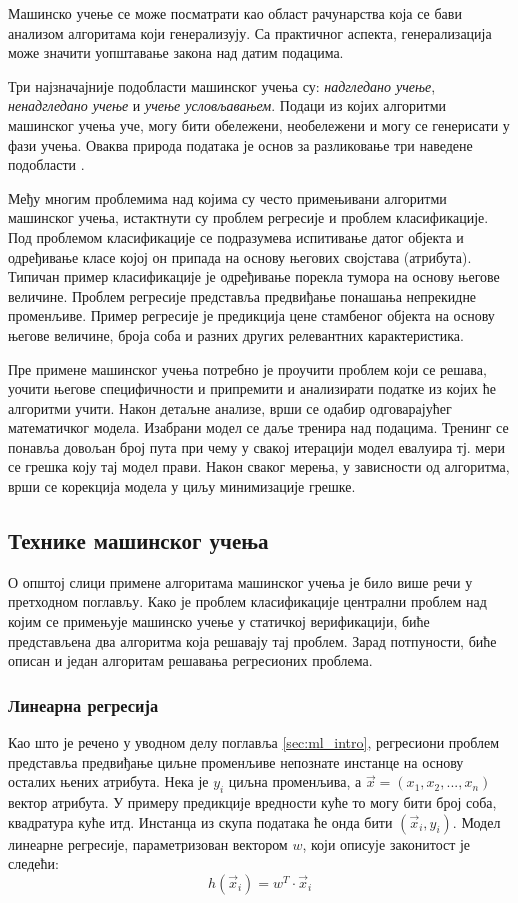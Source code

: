 \documentclass[a4paper]{article}
\begin{document}
{Машинско учење се може посматрати као област рачунарства која се бави анализом алгоритама који генерализују. Са практичног аспекта, генерализација може значити уопштавање закона над датим подацима.


Три најзначајније подобласти машинског учења су: \textit{надгледано учење}, \textit{ненадгледано учење} и \textit{учење условљавањем}. Подаци из којих алгоритми машинског учења уче, могу бити обележени, необележени и могу се генерисати у фази учења. Оваква природа података је основ за разликовање три наведене подобласти \cite{tom-ml}.


Међу многим проблемима над којима су често примењивани алгоритми машинског учења, истактнути су проблем регресије и проблем класификације. Под проблемом класификације се подразумева испитивање датог објекта и одређивање класе којој он припада на основу његових својстава (атрибута). Типичан пример класификације је одређивање порекла тумора на основу његове величине. Проблем регресије представља предвиђање понашања непрекидне променљиве. Пример регресије је предикција цене стамбеног објекта на основу његове величине, броја соба и разних других релевантних карактеристика.


Пре примене машинског учења потребно је проучити проблем који се решава, уочити његове специфичности и припремити и анализирати податке из којих ће алгоритми учити. Након детаљне анализе, врши се одабир одговарајућег математичког модела. Изабрани модел се даље тренира над подацима. Тренинг се понавља довољан број пута при чему у свакој итерацији модел евалуира тј. мери се грешка коју тај модел прави. Након сваког мерења, у зависности од алгоритма, врши се корекција модела у циљу минимизације грешке.
 


\subsection{Технике машинског учења}
О општој слици примене алгоритама машинског учења је било више речи у претходном поглављу. Како је проблем класификације централни проблем над којим се примењује машинско учење у статичкој верификацији, биће представљена два алгоритма која решавају тај проблем. Зарад потпуности, биће описан и један алгоритам решавања регресионих проблема.


\subsubsection*{Линеарна регресија}
Као што је речено у уводном делу поглавља \ref{sec:ml_intro}, регресиони проблем представља предвиђање циљне променљиве непознате инстанце на основу осталих њених атрибута. Нека је $y_i$ циљна променљива, а $\vec{x} = (x_1, x_2, ..., x_n)$ вектор атрибута. У примеру предикције вредности куће то могу бити број соба, квадратура куће итд. Инстанца из скупа података ће онда бити $(\vec{x}_i, y_i)$. Модел линеарне регресије, параметризован вектором $w$, који описује законитост је следећи:
\begin{equation}
    h(\vec{x}_i) = w^T \cdot \vec{x}_i
\end{equation}


}
\end{document}
